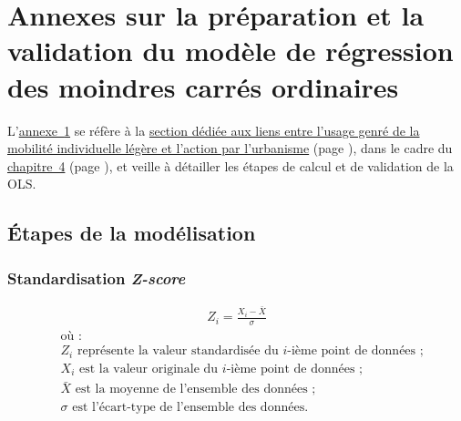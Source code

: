     \setcounter{section}{0}
\chapter{Annexes sur la préparation et la validation du modèle de régression des moindres carrés ordinaires}
    \label{annexes:methodologie-ols-cyclabilite-genre}

L'\hyperref[annexes:methodologie-ols-cyclabilite-genre]{annexe~\ref{annexes:methodologie-ols-cyclabilite-genre}} se réfère à la \hyperref[section-chap4:cyclabilite-genre]{section dédiée aux liens entre l'usage genré de la mobilité individuelle légère et l'action par l'urbanisme} (page \pageref{section-chap4:cyclabilite-genre}), dans le cadre du \hyperref[chap4:titre]{chapitre~4} (page \pageref{chap4:titre}), et veille à détailler les étapes de calcul et de validation de la \acrfull{OLS}.%

    \setcounter{tocdepth}{2}
    \renewcommand{\localcontentsname}{Structure de l'annexe~\ref{annexes:methodologie-ols-cyclabilite-genre}}
\localtableofcontents

    \newpage
    \newpage
\section{Étapes de la modélisation}
    \label{annexes:methodologie-ols-etapes}

\subsection{Standardisation \textsl{Z-score}}
    \label{annexes:methodologie-ols-z-score}

    \begin{equation}
    \label{annexes:equation:z-score}
    \begin{aligned}
Z_i = \frac{X_i - \bar{X}}{\sigma}
    \end{aligned}
    \end{equation}
\begin{align*}
    &\text{où~:} \\
    &Z_i \text{ représente la valeur standardisée du } i\text{-ième point de données~;} \\
    &X_i \text{ est la valeur originale du } i\text{-ième point de données~;} \\
    &\bar{X} \text{ est la moyenne de l'ensemble des données~;} \\
    &\sigma \text{ est l'écart-type de l'ensemble des données.}
\end{align*}

